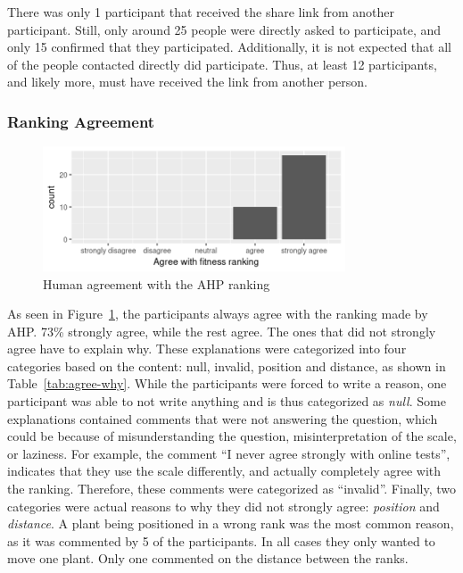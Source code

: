 There was only 1 participant that received the share link from another participant.
Still, only around 25 people were directly asked to participate, and only 15 confirmed that they participated.
Additionally, it is not expected that all of the people contacted directly did participate.
Thus, at least 12 participants, and likely more, must have received the link from another person.


\subsubsection{Ranking Agreement}
\begin{figure}
    \centering
    \includegraphics[width=0.8\textwidth]{figures/agree}
    \caption{Human agreement with the AHP ranking}
    \label{fig:agree}
\end{figure}

As seen in Figure~\ref{fig:agree}, the participants always agree with the ranking made by AHP.
73\% strongly agree, while the rest agree.
The ones that did not strongly agree have to explain why.
These explanations were categorized into four categories based on the content: null, invalid, position and distance, as shown in Table~\ref{tab:agree-why}.
While the participants were forced to write a reason, one participant was able to not write anything and is thus categorized as \textit{null}.
Some explanations contained comments that were not answering the question, which could be because of misunderstanding the question, misinterpretation of the scale, or laziness.
For example, the comment ``I never agree strongly with online tests'', indicates that they use the scale differently, and actually completely agree with the ranking.
Therefore, these comments were categorized as ``invalid''.
Finally, two categories were actual reasons to why they did not strongly agree: \textit{position} and \textit{distance}.
A plant being positioned in a wrong rank was the most common reason, as it was commented by 5 of the participants.
In all cases they only wanted to move one plant.
Only one commented on the distance between the ranks.

